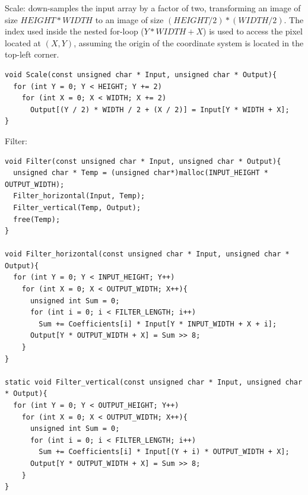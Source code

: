 \documentclass[
  course = {{ESE532 System-on-a-Chip}},
  quartile = {{}},
  assignment = 2,
  name = {{Sheil Sarda}},
  studentnumber = {{}},
  email = {{sheils@seas.upenn.edu}},
  firstexercise = 1
]{aga-homework}
\begin{document}
\exercise
\subexercise Scale: down-samples the input array by a factor of two, transforming an image of size $HEIGHT * WIDTH$ to an image of size $(HEIGHT / 2) * (WIDTH / 2)$. The index used inside the nested for-loop ($Y * WIDTH + X$) is used to access the pixel located at $(X, Y)$, assuming the origin of the coordinate system is located in the top-left corner.
\begin{verbatim}
void Scale(const unsigned char * Input, unsigned char * Output){
  for (int Y = 0; Y < HEIGHT; Y += 2)
    for (int X = 0; X < WIDTH; X += 2)
      Output[(Y / 2) * WIDTH / 2 + (X / 2)] = Input[Y * WIDTH + X];
}
\end{verbatim}


\subexercise Filter:

\begin{verbatim}
void Filter(const unsigned char * Input, unsigned char * Output){
  unsigned char * Temp = (unsigned char*)malloc(INPUT_HEIGHT * OUTPUT_WIDTH);
  Filter_horizontal(Input, Temp);
  Filter_vertical(Temp, Output);
  free(Temp);
}

void Filter_horizontal(const unsigned char * Input, unsigned char * Output){
  for (int Y = 0; Y < INPUT_HEIGHT; Y++)
    for (int X = 0; X < OUTPUT_WIDTH; X++){
      unsigned int Sum = 0;
      for (int i = 0; i < FILTER_LENGTH; i++)
        Sum += Coefficients[i] * Input[Y * INPUT_WIDTH + X + i];
      Output[Y * OUTPUT_WIDTH + X] = Sum >> 8;
    }
}

static void Filter_vertical(const unsigned char * Input, unsigned char * Output){
  for (int Y = 0; Y < OUTPUT_HEIGHT; Y++)
    for (int X = 0; X < OUTPUT_WIDTH; X++){
      unsigned int Sum = 0;
      for (int i = 0; i < FILTER_LENGTH; i++)
        Sum += Coefficients[i] * Input[(Y + i) * OUTPUT_WIDTH + X];
      Output[Y * OUTPUT_WIDTH + X] = Sum >> 8;
    }
}
\end{verbatim}
\end{document}
